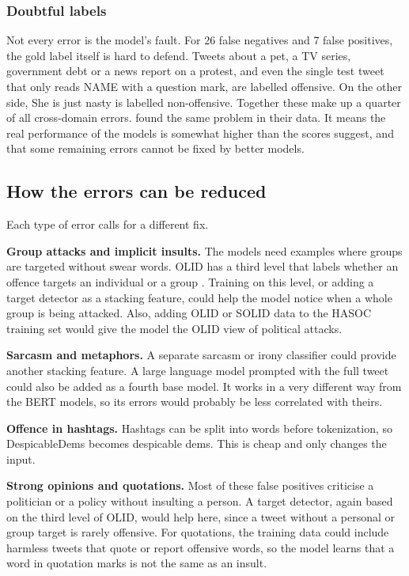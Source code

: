 \documentclass[11pt,a4paper]{article}
\begin{document}
\subsubsection{Doubtful labels}

Not every error is the model's fault. For 26 false negatives and 7 false positives, the gold label itself is hard to defend. Tweets about a pet, a TV series, government debt or a news report on a protest, and even the single test tweet that only reads NAME with a question mark, are labelled offensive. On the other side, She is just nasty is labelled non-offensive. Together these make up a quarter of all cross-domain errors. \citet{vanaken2018challenges} found the same problem in their data. It means the real performance of the models is somewhat higher than the scores suggest, and that some remaining errors cannot be fixed by better models.

\subsection{How the errors can be reduced}

Each type of error calls for a different fix.

\textbf{Group attacks and implicit insults.} The models need examples where groups are targeted without swear words. OLID has a third level that labels whether an offence targets an individual or a group \citep{zampieri2019olid}. Training on this level, or adding a target detector as a stacking feature, could help the model notice when a whole group is being attacked. Also, adding OLID or SOLID data to the HASOC training set would give the model the OLID view of political attacks.

\textbf{Sarcasm and metaphors.} A separate sarcasm or irony classifier could provide another stacking feature. A large language model prompted with the full tweet could also be added as a fourth base model. It works in a very different way from the BERT models, so its errors would probably be less correlated with theirs.

\textbf{Offence in hashtags.} Hashtags can be split into words before tokenization, so DespicableDems becomes despicable dems. This is cheap and only changes the input.

\textbf{Strong opinions and quotations.} Most of these false positives criticise a politician or a policy without insulting a person. A target detector, again based on the third level of OLID, would help here, since a tweet without a personal or group target is rarely offensive. For quotations, the training data could include harmless tweets that quote or report offensive words, so the model learns that a word in quotation marks is not the same as an insult.
\end{document}
